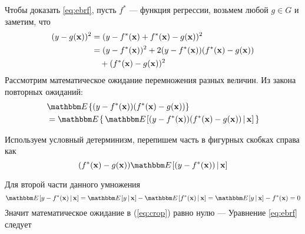 \begin{frame}

    \vspace{2em}
    Чтобы доказать \eqref{eq:ebrf}, пусть $f^*$ --- функция регрессии, возьмем любой $g \in G$ и заметим, что 
    \begin{align*}
        (y - g({\mathbf x}))^2 
        & = (y - f^*({\mathbf x}) + f^*({\mathbf x}) - g({\mathbf x}))^2  \\
        & = (y - f^*({\mathbf x}) )^2 + 2(y - f^*({\mathbf x}))(f^*({\mathbf x}) - g({\mathbf x}))\\&\quad +
        (f^*({\mathbf x}) - g({\mathbf x}))^2  
    \end{align*}
    Рассмотрим математическое ожидание перемножения разных величин. Из закона повторных ожиданий:
    \begin{align}
        \label{eq:crop}
        &\EE \{ (y - f^*(\boldx)) (f^*(\boldx) - g(\boldx)) \}
        \\ \nonumber & = \EE \{ \, \EE[ (y - f^*(\boldx)) (f^*(\boldx) - g(\boldx)) \given \boldx ]\,  \} 
    \end{align}

\end{frame}
    
\begin{frame}
    
    \vspace{2em}
    Используем условный детерминизм, перепишем часть в фигурных скобках справа как
    $$(f^*(\boldx) - g(\boldx)) \EE[ (y - f^*(\boldx))  \given \boldx ]$$

    Для второй части данного умножения
    \begin{equation*}
         \EE[ y - f^*(\boldx) \given \boldx] 
         = \EE[ y \given \boldx] - \EE[ f^*(\boldx) \given \boldx] 
         = \EE[ y \given \boldx] -  f^*(\boldx)
         = 0
    \end{equation*}
    Значит математическое ожидание в (\ref{eq:crop}) равно нулю --- Уравнение \eqref{eq:ebrf} следует
        
\end{frame}

